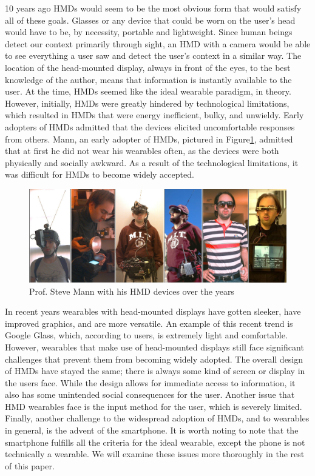 \documentclass[11pt]{article}
\begin{document}
10 years ago HMDs would seem to be the most obvious form that would satisfy all of these goals. Glasses or any device that could be worn on the user's head would have to be, by necessity, portable and lightweight. Since human beings detect our context primarily through sight, an HMD with a camera would be able to see everything a user saw and detect the user's context in a similar way. The location of the head-mounted display, always in front of the eyes, to the best knowledge of the author, means that information is instantly available to the user. At the time, HMDs seemed like the ideal wearable paradigm, in theory. However, initially, HMDs were greatly hindered by technological limitations, which resulted in HMDs that were energy inefficient, bulky, and unwieldy\cite{fromCyborgsToGG}. Early adopters of HMDs admitted that the devices elicited uncomfortable responses from others. Mann, an early adopter of HMDs, pictured in Figure\ref{fig:Mann}, admitted that at first he did not wear his wearables often, as the devices were both physically and socially awkward\cite{smartClothingShift}.  As a result of the technological limitations, it was difficult for HMDs to become widely accepted.  

\begin{figure}[H] %
   \centering
   \includegraphics[width=5in]{Wearcompevolution2.jpg}       
   \caption{Prof. Steve Mann with his HMD devices over the years \cite{wearablesOverTime}}
   \label{fig:Mann}
\end{figure} 

In recent years wearables with head-mounted displays have gotten sleeker, have improved graphics, and are more versatile. An example of this recent trend is Google Glass, which, according to users, is extremely light and comfortable. However, wearables that make use of head-mounted displays still face significant challenges that prevent them from becoming widely adopted. The overall design of HMDs have stayed the same; there is always some kind of screen or display in the users face. While the design allows for immediate access to information, it also has some unintended social consequences for the user. Another issue that HMD wearables face is the input method for the user, which is severely limited. Finally, another challenge to the widespread adoption of HMDs, and to wearables in general, is the advent of the smartphone. It is worth noting to note that the smartphone fulfills all the criteria for the ideal wearable, except the phone is not technically a wearable. We will examine these issues more thoroughly in the rest of this paper.
\end{document}
